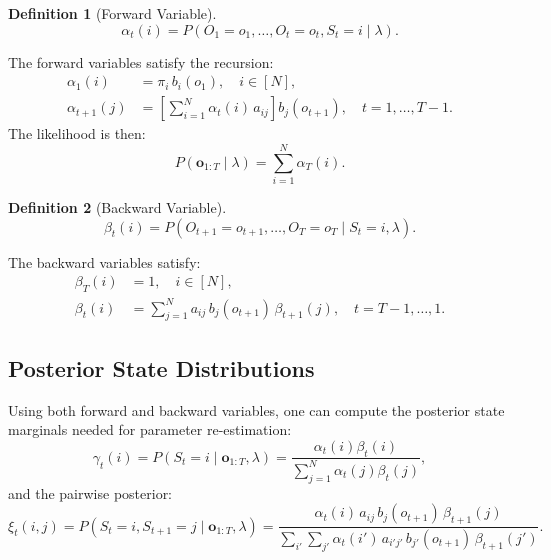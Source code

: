 \documentclass[conference]{IEEEtran}
\newtheorem{definition}{Definition}
\begin{document}
\begin{definition}[Forward Variable]
\begin{equation}
\alpha_t(i) = P(O_1 = o_1, \ldots, O_t = o_t, S_t = i \mid \lambda).
\label{eq:forward_def}
\end{equation}
\end{definition}

The forward variables satisfy the recursion:
\begin{align}
\alpha_1(i) &= \pi_i \, b_i(o_1), \quad i \in [N], \label{eq:forward_init} \\
\alpha_{t+1}(j) &= \left[\sum_{i=1}^{N} \alpha_t(i) \, a_{ij}\right] b_j(o_{t+1}), \quad t = 1, \ldots, T-1. \label{eq:forward_recur}
\end{align}
The likelihood is then:
\begin{equation}
P(\mathbf{o}_{1:T} \mid \lambda) = \sum_{i=1}^{N} \alpha_T(i).
\label{eq:likelihood}
\end{equation}

\begin{definition}[Backward Variable]
\begin{equation}
\beta_t(i) = P(O_{t+1} = o_{t+1}, \ldots, O_T = o_T \mid S_t = i, \lambda).
\label{eq:backward_def}
\end{equation}
\end{definition}

The backward variables satisfy:
\begin{align}
\beta_T(i) &= 1, \quad i \in [N], \label{eq:backward_init} \\
\beta_t(i) &= \sum_{j=1}^{N} a_{ij} \, b_j(o_{t+1}) \, \beta_{t+1}(j), \quad t = T-1, \ldots, 1. \label{eq:backward_recur}
\end{align}

\subsection{Posterior State Distributions}

Using both forward and backward variables, one can compute the posterior state marginals needed for parameter re-estimation:
\begin{equation}
\gamma_t(i) = P(S_t = i \mid \mathbf{o}_{1:T}, \lambda) = \frac{\alpha_t(i) \beta_t(i)}{\sum_{j=1}^{N} \alpha_t(j) \beta_t(j)},
\label{eq:gamma}
\end{equation}
and the pairwise posterior:
\begin{equation}
\xi_t(i,j) = P(S_t = i, S_{t+1} = j \mid \mathbf{o}_{1:T}, \lambda) = \frac{\alpha_t(i) \, a_{ij} \, b_j(o_{t+1}) \, \beta_{t+1}(j)}{\sum_{i'}\sum_{j'} \alpha_t(i') \, a_{i'j'} \, b_{j'}(o_{t+1}) \, \beta_{t+1}(j')}.
\label{eq:xi}
\end{equation}
\end{document}
